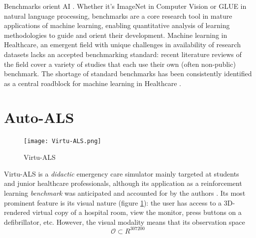 Benchmarks orient AI \cite{liangHolisticEvaluationLanguage2022}. Whether it's ImageNet \cite{dengImagenetLargescaleHierarchical2009} in Computer Vision or GLUE \cite{wangGLUEMultitaskBenchmark2018} in natural language processing, benchmarks are a core research tool in mature applications of machine learning, enabling quantitative analysis of learning methodologies to guide and orient their development.
Machine learning in Healthcare, an emergent field with unique challenges in availability of research datasets \cite{Anshik2021Handling, Gilbert2015market, Pahwa2021Big, Yazhini2019State} lacks an accepted benchmarking standard: recent literature reviews \cite{palMachineLearningHealthcare2023,tortorellaHealthcareTrendsChallenges2020} of the field cover a variety of studies that each use their own (often non-public) benchmark. The shortage of standard benchmarks has been consistently identified as a central roadblock for machine learning in Healthcare
\cite{Crown2015Potential, David2020Evaluating, guSupervisedLearningPervasive2023, harutyunyanMultitaskLearningBenchmarking2019, Kathrin2022Benchmark, liventsevEffectivePatientSimulators2021, mcdermottReproducibilityMachineLearning2021, purushothamBenchmarkingDeepLearning2018, S2017Benchmark}.

\newpage
\section{Auto-ALS}
\label{sec:virtu-als}


\begin{figure}
    \centering
    \texttt{[image: Virtu-ALS.png]}
    \caption{Virtu-ALS}
    \label{fig:virtu-als}
\end{figure}

Virtu-ALS is a \emph{didactic} emergency care simulator mainly targeted at students and junior healthcare professionals, although its application as a reinforcement learning \emph{benchmark} was anticipated and accounted for by the authors \cite{briskAIEnhanceInteractive2018}.
Its most prominent feature is its visual nature (figure \ref{fig:virtu-als}): the user has access to a 3D-rendered virtual copy of a hospital room, view the monitor, press buttons on a defibrillator, etc.
However, the visual modality means that its observation space 
\begin{equation}
    \mathcal{O} \subset R^{307200}
\end{equation}

